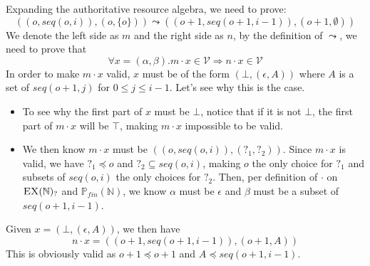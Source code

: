 \documentclass{article}
\begin{document}
Expanding the authoritative resource algebra, we need to prove:
$$( ( o, seq(o, i) ) , ( o, \{o\} ) ) \leadsto ( ( o+1, seq(o+1, i-1)) , ( o+1, \emptyset ) )$$
We denote the left side as $m$ and the right side as $n$, by the definition of $\leadsto$,
we need to prove that
$$\forall x = (\alpha, \beta). m \cdot x \in \mathcal{V} \Rightarrow n \cdot x \in \mathcal{V}$$
In order to make $m \cdot x$ valid, $x$ must be of the form $(\bot, (\epsilon, A))$ where
$A$ is a set of $seq(o+1, j)$ for $0 \leq j \leq i-1$. Let's see why this is the case.

\begin{itemize}
    \item To see why the first part of $x$ must be $\bot$,
    notice that if it is not $\bot$, the first part of $m \cdot x$ will be $\top$, making $m \cdot x$
    impossible to be valid.
    \item We then know $m \cdot x$ must be $((o,seq(o,i)), (?_1, ?_2))$. Since $m \cdot x$ is valid,
    we have $?_1 \preccurlyeq o$ and $?_2 \subseteq seq(o,i)$, making $o$ the only choice
    for $?_1$ and subsets of $seq(o,i)$ the only choices for $?_2$. Then, per definition of
    $\cdot$ on $\textsc{EX}(\mathbb{N})_?$ and $\mathbb{P}_{fin}(\mathbb{N})$, we know
    $\alpha$ must be $\epsilon$ and $\beta$ must be a subset of $seq(o+1, i-1)$.
\end{itemize}

Given $x = (\bot, (\epsilon, A))$, we then have
$$n \cdot x = ((o+1, seq(o+1, i-1)), (o+1, A))$$
This is obviously valid as $o+1 \preccurlyeq o+1$ and $A \preccurlyeq seq(o+1, i-1)$.
\end{document}
